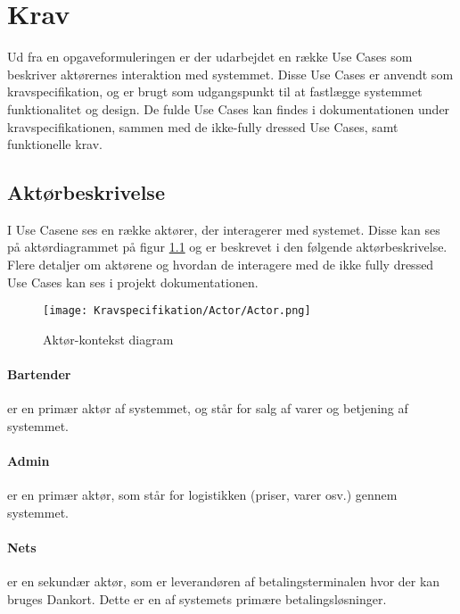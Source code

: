 \chapter{Krav}
Ud fra en opgaveformuleringen er der udarbejdet en række Use Cases som beskriver aktørernes interaktion med systemmet. Disse Use Cases er anvendt som kravspecifikation, og er brugt som udgangspunkt til at fastlægge systemmet funktionalitet og design. De fulde Use Cases kan findes i dokumentationen under kravspecifikationen, sammen med de ikke-fully dressed Use Cases, samt funktionelle krav. \newline


\begin{minipage}{0.45\textwidth}
\raggedright
\section{Aktørbeskrivelse}
I Use Casene ses en række aktører, der interagerer med systemet. Disse kan ses på aktørdiagrammet på figur \ref{fig:actordiagram} og er beskrevet i den følgende aktørbeskrivelse. Flere detaljer om aktørene og hvordan de interagere med de ikke fully dressed Use Cases kan ses i projekt dokumentationen. 
\newline
\newline
\end{minipage}
\begin{minipage}{0.55\textwidth}
\begin{figure}[H]
	\centering
	\texttt{[image: Kravspecifikation/Actor/Actor.png]}
	\caption{Aktør-kontekst diagram}
	\label{fig:actordiagram}
\end{figure}
\end{minipage} \hfill
\newline
\subsubsection*{Bartender}
er en primær aktør af systemmet, og står for salg af varer og betjening af systemmet. 

\subsubsection*{Admin}
er en primær aktør, som står for logistikken (priser, varer osv.) gennem systemmet. 

\subsubsection*{Nets}
er en sekundær aktør, som er leverandøren af betalingsterminalen hvor der kan bruges Dankort. Dette er en af systemets primære betalingsløsninger.

